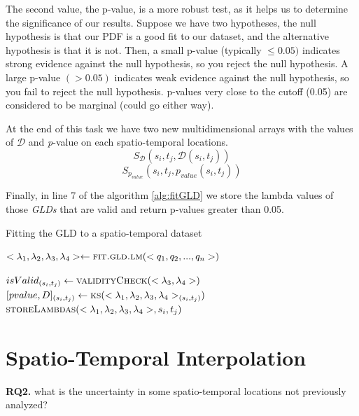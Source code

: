 The second value, the p-value, is a more robust test, as it helps us to determine the significance of our results. Suppose we have two hypotheses, the null hypothesis  is that our PDF is a good fit to our dataset, and the alternative hypothesis  is that it is not. Then, a small p-value (typically $\leq 0.05)$ indicates strong evidence against the null hypothesis, so you reject the null hypothesis. A large p-value $(> 0.05)$ indicates weak evidence against the null hypothesis, so you fail to reject the null hypothesis. p-values very close to the cutoff (0.05) are considered to be marginal (could go either way). 

At the end of this task we have two new multidimensional arrays with the values of $\mathcal{D}$ and \textit{p}-value on each spatio-temporal locations.
\begin{equation}
S_{\mathcal{D}}(s_{i},t_{j},\mathcal{D}(s_{i},t_{j}))
\end{equation}
\begin{equation}
S_{p_{value}}(s_{i},t_{j},p_{value}(s_{i},t_{j}))
\end{equation}

Finally, in line 7 of the algorithm \ref{alg:fitGLD} we store the lambda values of those \textit{GLDs} that are valid and return p-values greater than 0.05.

\begin{algorithm} 
\caption{Fitting the GLD to a spatio-temporal dataset}\label{alg:fitGLD}
\begin{algorithmic}[1] 
\State $<\lambda_{1},\lambda_{2},\lambda_{3},\lambda_{4}> \gets \Call {fit.gld.lm}{<q_1,q_2,...,q_n>}$

\State $isValid_{(s_{i},t_{j})} \gets \Call {validityCheck}{<\lambda_{3},\lambda_{4}>}$
\State $[pvalue,D]_{(s_{i},t_{j})} \gets \Call{ks}{<\lambda_{1},\lambda_{2},\lambda_{3},\lambda_{4}>_{(s_{i},t_{j})}}$
\EndIf
{}
\State $\Call{storeLambdas}{<\lambda_{1},\lambda_{2},\lambda_{3},\lambda_{4}>,s_{i},t_{j}}$
\EndIf
\EndFunction 
\end{algorithmic} 
\end{algorithm} 

\section{Spatio-Temporal Interpolation}

\begin{tcolorbox}
\textbf{RQ2.} what is the uncertainty in some spatio-temporal locations not previously analyzed?
\end{tcolorbox}

